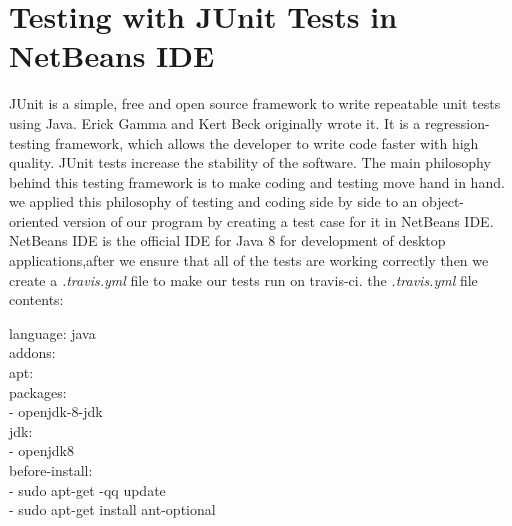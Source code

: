 \section{Testing with JUnit Tests in NetBeans IDE}
JUnit is a simple, free and open source framework to write repeatable unit tests using Java. Erick Gamma and Kert Beck originally wrote it. It is a regression-testing framework, which allows the developer to write code faster with high quality. JUnit tests increase the stability of the software.
The main philosophy behind this testing framework is to make coding and testing move hand in hand.
we  applied this philosophy of testing and coding side by side to an object-oriented version of our program by creating a test case for it in NetBeans IDE. NetBeans IDE is the official IDE for Java 8 for development of desktop applications,after we ensure that all of the tests are working correctly then we create a \textit{.travis.yml} file to make our tests run on travis-ci.
the \textit{.travis.yml} file contents:
  \begin{tcolorbox}[breakable,notitle,boxrule=0pt,colback=blue!20,colframe=blue!20]
    { language: java\\
    addons:\\
      apt:\\
        packages:\\
          - openjdk-8-jdk\\
    jdk:\\
      - openjdk8\\
    before-install:\\
        - sudo apt-get -qq update\\
        - sudo apt-get install ant-optional\\
    }
    \end{tcolorbox}